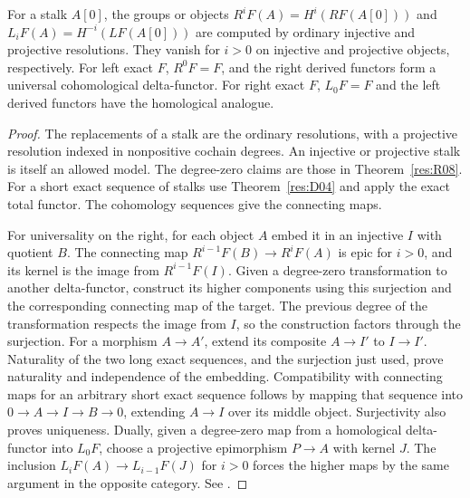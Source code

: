 \begin{theorem}
\label{res:R09}
For a stalk \(A[0]\), the groups or objects
\(R^iF(A)=H^i(RF(A[0]))\) and \(L_iF(A)=H^{-i}(LF(A[0]))\)
are computed by ordinary injective and projective resolutions.
They vanish for \(i>0\) on injective and projective objects,
respectively. For left exact \(F\), \(R^0F=F\), and the right derived
functors form a universal cohomological delta-functor. For right exact
\(F\), \(L_0F=F\) and the left derived functors have the homological
analogue.
\end{theorem}
\begin{proof}
The replacements of a stalk are the ordinary resolutions, with a
projective resolution indexed in nonpositive cochain degrees. An
injective or projective stalk is itself an allowed model. The degree-zero
claims are those in Theorem~\ref{res:R08}. For a short exact sequence
of stalks use Theorem~\ref{res:D04} and apply the exact total functor.
The cohomology sequences give the connecting maps.

For universality on the right, for each object \(A\) embed it in an
injective \(I\) with quotient \(B\). The connecting map
\(R^{i-1}F(B)\to R^iF(A)\) is epic for \(i>0\), and its kernel is the
image from \(R^{i-1}F(I)\). Given a degree-zero transformation to
another delta-functor, construct its higher components using this
surjection and the corresponding connecting map of the target.
The previous degree of the transformation respects the image from \(I\),
so the construction factors through the surjection. For a morphism
\(A\to A'\), extend its composite \(A\to I'\) to \(I\to I'\).
Naturality of the two long exact sequences, and the surjection just
used, prove naturality and independence of the embedding. Compatibility
with connecting maps for an arbitrary short exact sequence follows by
mapping that sequence into \(0\to A\to I\to B\to0\), extending \(A\to I\)
over its middle object. Surjectivity also proves uniqueness.
Dually, given a degree-zero map from a homological delta-functor into
\(L_0F\), choose a projective epimorphism \(P\to A\) with kernel \(J\).
The inclusion \(L_iF(A)\to L_{i-1}F(J)\) for \(i>0\) forces the
higher maps by the same argument in the opposite category. See
\cite[Tags 015A, 05TE, 015B]{stacks-derived}.
\end{proof}

